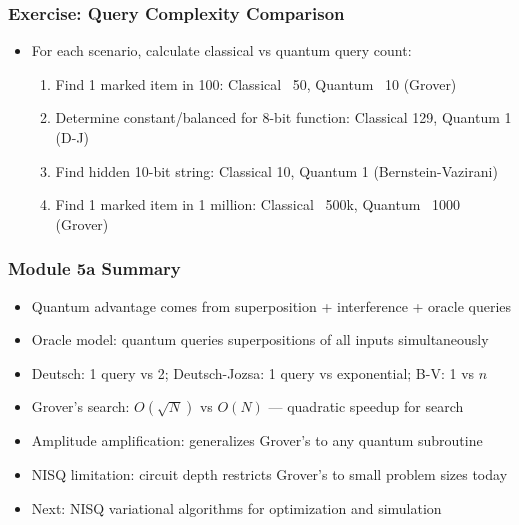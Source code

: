 \begin{frame}[fragile]\frametitle{Exercise: Query Complexity Comparison}
\begin{itemize}
\item For each scenario, calculate classical vs quantum query count:
\begin{enumerate}
  \item Find 1 marked item in 100: Classical ~50, Quantum ~10 (Grover)
  \item Determine constant/balanced for 8-bit function: Classical 129, Quantum 1 (D-J)
  \item Find hidden 10-bit string: Classical 10, Quantum 1 (Bernstein-Vazirani)
  \item Find 1 marked item in 1 million: Classical ~500k, Quantum ~1000 (Grover)
\end{enumerate}
\end{itemize}
\end{frame}

\begin{frame}[fragile]\frametitle{Module 5a Summary}
\begin{itemize}
\item Quantum advantage comes from superposition + interference + oracle queries
\item Oracle model: quantum queries superpositions of all inputs simultaneously
\item Deutsch: 1 query vs 2; Deutsch-Jozsa: 1 query vs exponential; B-V: 1 vs $n$
\item Grover's search: $O(\sqrt{N})$ vs $O(N)$ --- quadratic speedup for search
\item Amplitude amplification: generalizes Grover's to any quantum subroutine
\item NISQ limitation: circuit depth restricts Grover's to small problem sizes today
\item Next: NISQ variational algorithms for optimization and simulation
\end{itemize}
\end{frame}
